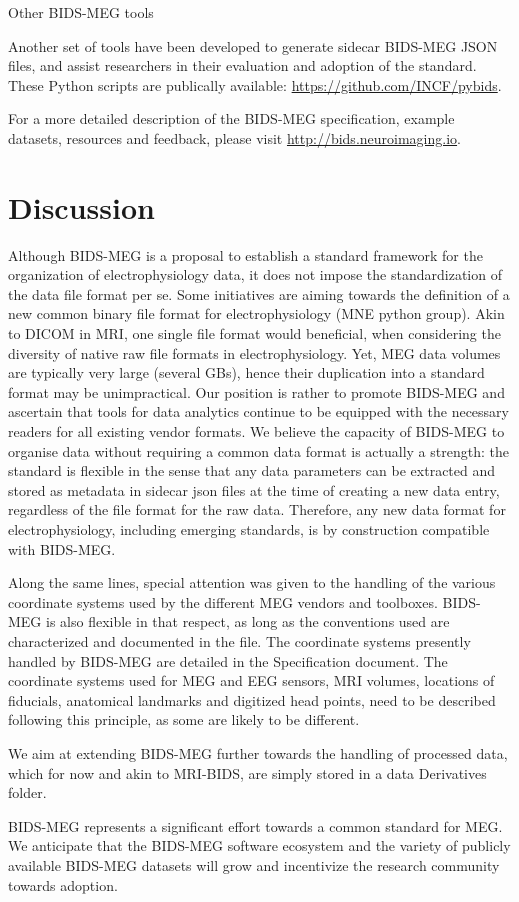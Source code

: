 Other BIDS-MEG tools

Another set of tools have been developed to generate sidecar BIDS-MEG JSON files, and assist researchers in their evaluation  and adoption of the standard. These Python scripts are publically available:  \url{https://github.com/INCF/pybids}.

For a more detailed description of the BIDS-MEG specification, example datasets, resources and feedback, please visit \url{http://bids.neuroimaging.io}.

\section{Discussion}
Although BIDS-MEG is a proposal to establish a standard framework for the organization of electrophysiology data, it does not impose the standardization of the data file format per se. Some initiatives are aiming towards the definition of a new common binary file format for electrophysiology (MNE python group). Akin to DICOM in MRI, one single file format would beneficial, when considering the diversity of native raw file formats in electrophysiology. Yet, MEG data volumes are typically very large (several GBs), hence their duplication into a standard format may be unimpractical. Our position is rather to promote BIDS-MEG and ascertain that tools for data analytics continue to be equipped with the necessary readers for all existing vendor formats. We believe the capacity of BIDS-MEG to organise data without requiring a common data format is actually a strength: the standard is flexible in the sense that any data parameters can be extracted and stored as metadata in sidecar json files at the time of creating a new data entry, regardless of the file format for the raw data. Therefore, any new data format for electrophysiology, including emerging standards, is by construction compatible with BIDS-MEG.

Along the same lines, special attention was given to the handling of the various  coordinate systems used by the different MEG vendors and toolboxes. BIDS-MEG is also flexible in that respect, as long as the conventions used are characterized and documented in the  file. The coordinate systems presently handled by BIDS-MEG are detailed in the Specification document. The coordinate systems used for MEG and EEG sensors, MRI volumes, locations of fiducials, anatomical landmarks and digitized head points, need to be described following this principle, as some are likely to be different.

We aim at extending BIDS-MEG further towards the handling of processed data, which for now and akin to MRI-BIDS, are simply stored in a data Derivatives folder.

BIDS-MEG represents a significant effort towards a common standard for MEG. We anticipate that the BIDS-MEG software ecosystem and the variety of publicly available BIDS-MEG datasets will grow and incentivize the research community towards adoption. 
